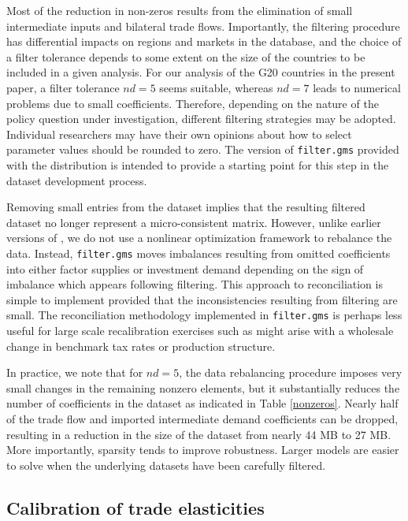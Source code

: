 Most of the reduction in non-zeros results from the elimination of
small intermediate inputs and bilateral trade flows. Importantly, the
filtering procedure has differential impacts on regions and markets in
the database, and the choice of a filter tolerance depends to some
extent on the size of the countries to be included in a given
analysis. For our analysis of the G20 countries in the present paper,
a filter tolerance $nd=5$ seems suitable, whereas $nd=7$ leads to
numerical problems due to small coefficients. Therefore, depending on
the nature of the policy question under investigation, different
filtering strategies may be adopted. Individual researchers may have
their own opinions about how to select parameter values should be
rounded to zero. The version of \texttt{filter.gms} provided with the
\GTAPINGAMS distribution is intended to provide a starting point for
this step in the dataset development process.

Removing small entries from the dataset implies that the resulting
filtered dataset no longer represent a micro-consistent matrix.
However, unlike earlier versions of \GTAPINGAMS, we do not use a
nonlinear optimization framework to rebalance the data. Instead,
\texttt{filter.gms} moves imbalances resulting from omitted
coefficients into either factor supplies or investment demand
depending on the sign of imbalance which appears following filtering.
This approach to reconciliation is simple to implement provided that
the inconsistencies resulting from filtering are small. The
reconciliation methodology implemented in \texttt{filter.gms} is
perhaps less useful for large scale recalibration exercises such as
might arise with a wholesale change in benchmark tax rates or production
structure.

In practice, we note that for $nd=5$, the data rebalancing procedure
imposes very small changes in the remaining nonzero elements, but it
substantially reduces the number of coefficients in the dataset as
indicated in Table \ref{nonzeros}. Nearly half of the trade flow and
imported intermediate demand coefficients can be dropped, resulting in
a reduction in the size of the dataset from nearly 44 MB to 27 MB.
More importantly, sparsity tends to improve robustness. Larger models
are easier to solve when the underlying datasets have been carefully
filtered.

\subsection{Calibration of trade elasticities}

